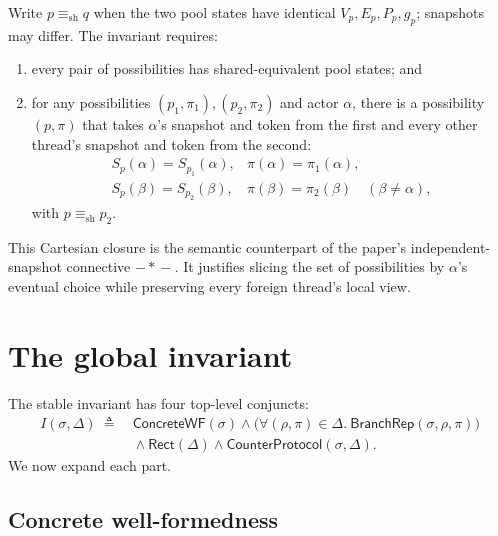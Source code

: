 \documentclass[11pt]{article}
\theoremstyle{definition}
\theoremstyle{remark}
\newcommand{\poss}{\Delta}
\newcommand{\conc}{\sigma}
\newcommand{\abst}{\rho}
\newcommand{\tokens}{\pi}
\newcommand{\wandsep}{\mathbin{-\!*\!-}}
\begin{document}
Write \(p\equiv_{\mathrm{sh}}q\) when the two pool states have identical
\(V_p,E_p,P_p,g_p\); snapshots may differ.  The invariant requires:
\begin{enumerate}
\item every pair of possibilities has shared-equivalent pool states; and
\item for any possibilities \((p_1,\pi_1),(p_2,\pi_2)\) and actor \(\alpha\),
there is a possibility \((p,\pi)\) that takes \(\alpha\)'s snapshot and token
from the first and every other thread's snapshot and token from the second:
\[
\begin{array}{ll}
 S_p(\alpha)=S_{p_1}(\alpha), & \pi(\alpha)=\pi_1(\alpha),\\
 S_p(\beta)=S_{p_2}(\beta), & \pi(\beta)=\pi_2(\beta)\quad(\beta\ne\alpha),
\end{array}
\]
with \(p\equiv_{\mathrm{sh}}p_2\).
\end{enumerate}
This Cartesian closure is the semantic counterpart of the paper's
independent-snapshot connective \(\wandsep\).  It justifies slicing the set of
possibilities by \(\alpha\)'s eventual choice while preserving every foreign
thread's local view.

\section{The global invariant}

The stable invariant has four top-level conjuncts:
\[
\boxed{\begin{aligned}
  I(\conc,\poss)\ \triangleq\ {}&
  \mathsf{ConcreteWF}(\conc)
  \land
  \bigl(\forall(\abst,\tokens)\in\poss.\
        \mathsf{BranchRep}(\conc,\abst,\tokens)\bigr)\\
  &{}\land \mathsf{Rect}(\poss)
  \land \mathsf{CounterProtocol}(\conc,\poss).
\end{aligned}}
\]
We now expand each part.

\subsection{Concrete well-formedness}
\end{document}
